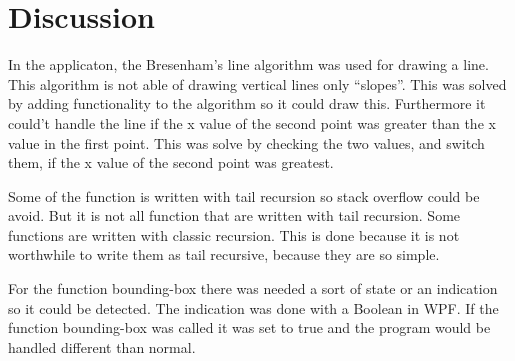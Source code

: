 \chapter{Discussion}
\label{chp:disc}

In the applicaton, the Bresenham’s line algorithm was used for drawing a line. This algorithm is not able of drawing vertical lines only “slopes”. This was solved by adding functionality to the algorithm so it could draw this. Furthermore it could't handle the line if the x value of the second point was greater than the x value in the first point. This was solve by checking the two values, and switch them, if the x value of the second point was greatest.

Some of the function is written with tail recursion so stack overflow could be avoid. But it is not all function that are written with tail recursion. Some functions  are written with classic recursion. This is done because it is not worthwhile to write them as tail recursive, because they are so simple.

For the function bounding-box there was needed a sort of state or an indication so it could be detected. The indication was done with a Boolean in WPF. If the function bounding-box was called it was set to true and the program would be handled different than normal.
